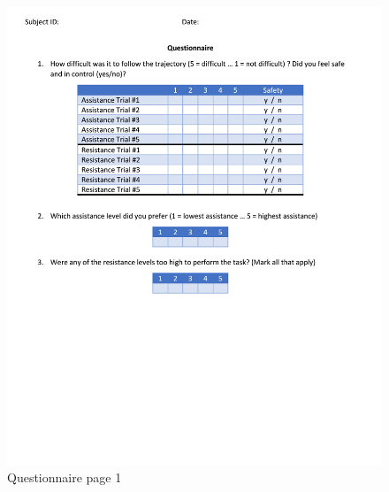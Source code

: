 \documentclass[12pt]{report}
\begin{document}
\begin{figure}[p] 
	\centering
	\includegraphics[width=\linewidth]{questionnaire_p1}
	\caption{Questionnaire page 1}
	\label{fig:q_p1}
\end{figure}
\end{document}
